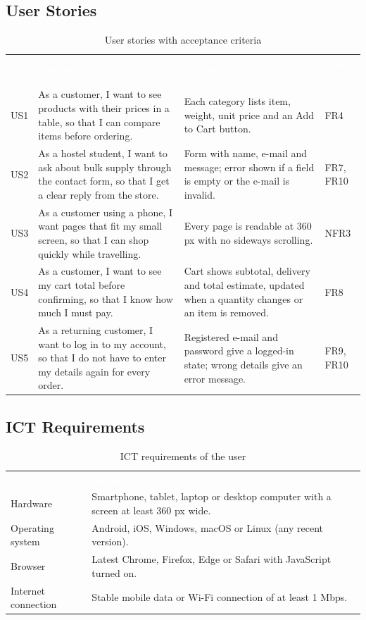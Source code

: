 \documentclass[10pt,a4paper]{article}
\newcommand{\hc}[1]{\textcolor{white}{\bfseries #1}}
\newcommand{\tbl}{\rowcolors{2}{white}{gkbg}\renewcommand{\arraystretch}{1.2}\footnotesize}
\begin{document}
\subsection{User Stories}
\begin{table}[H]
\centering
\caption{User stories with acceptance criteria}\label{tab:us}
\tbl
\begin{tabularx}{\textwidth}{@{}cYYl@{}}
\hc{ID} & \hc{User story} & \hc{Acceptance criterion} & \hc{Links to}\\
US1 & As a customer, I want to see products with their prices in a table, so that I can compare items before ordering. & Each category lists item, weight, unit price and an Add to Cart button. & FR4\\
US2 & As a hostel student, I want to ask about bulk supply through the contact form, so that I get a clear reply from the store. & Form with name, e-mail and message; error shown if a field is empty or the e-mail is invalid. & FR7, FR10\\
US3 & As a customer using a phone, I want pages that fit my small screen, so that I can shop quickly while travelling. & Every page is readable at 360 px with no sideways scrolling. & NFR3\\
US4 & As a customer, I want to see my cart total before confirming, so that I know how much I must pay. & Cart shows subtotal, delivery and total estimate, updated when a quantity changes or an item is removed. & FR8\\
US5 & As a returning customer, I want to log in to my account, so that I do not have to enter my details again for every order. & Registered e-mail and password give a logged-in state; wrong details give an error message. & FR9, FR10\\
\end{tabularx}
\end{table}

\subsection{ICT Requirements}\label{sec:ict}
\begin{table}[H]
\centering
\caption{ICT requirements of the user}
\tbl
\begin{tabularx}{\textwidth}{@{}lY@{}}
\hc{Item} & \hc{Requirement}\\
Hardware & Smartphone, tablet, laptop or desktop computer with a screen at least 360 px wide.\\
Operating system & Android, iOS, Windows, macOS or Linux (any recent version).\\
Browser & Latest Chrome, Firefox, Edge or Safari with JavaScript turned on.\\
Internet connection & Stable mobile data or Wi-Fi connection of at least 1 Mbps.\\
\end{tabularx}
\end{table}
\end{document}
